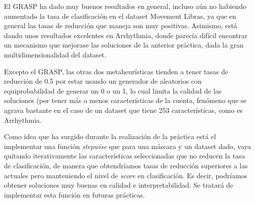 \documentclass[a4paper,11pt]{article}
\begin{document}
  El GRASP ha dado muy buenos resultados en general, incluso aún no habiendo aumentado la tasa de clasificación en el 
  dataset Movement Libras, ya que en general las tasas de reducción que maneja son muy positivas. Asimismo, está dando
  unos resultados excelentes en Arrhythmia, donde parecía difícil encontrar un mecanismo que mejorase las soluciones de
  la anterior práctica, dada la gran multidimensionalidad del dataset.
  
  Excepto el GRASP, las otras dos metaheurísticas tienden a tener tasas de reducción de 0.5 por estar usando un generador
  de aleatorios con equiprobabilidad de generar un 0 o un 1, lo cual limita la calidad de las soluciones (por tener más 
  o menos características de la cuenta, fenómeno que se agrava bastante en el caso de un dataset que tiene 253 
  características, como es Arrhythmia.
  
  Como idea que ha surgido durante la realización de la práctica está el implementar una función \textit{stepwise} que para
  una máscara y un dataset dado, vaya quitando iterativamente las características seleccionadas que no reducen la tasa de
  clasificación, de manera que obtendríamos tasas de reducción superiores a las actuales pero manteniendo el nivel de 
  \textit{score} en clasificación. Es decir, podríamos obtener soluciones muy buenas en calidad e interpretabilidad. Se
  tratará de implementar esta función en futuras prácticas.
  
\end{document}
